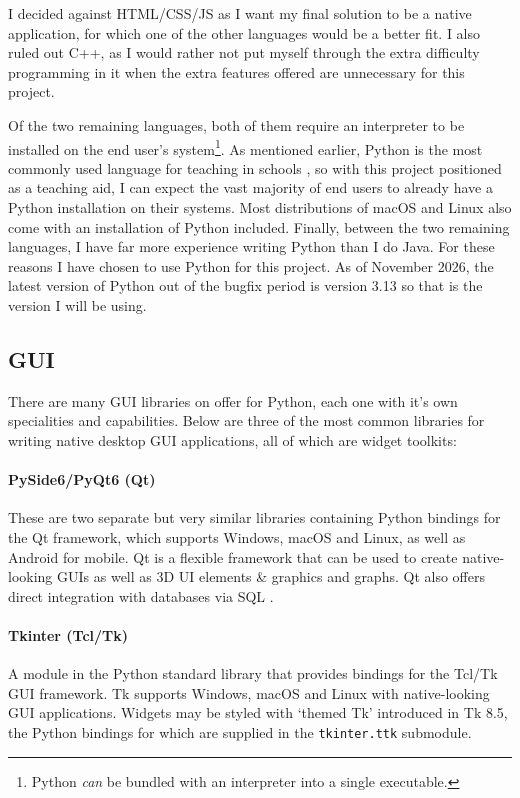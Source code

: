 \documentclass{report}
\begin{document}
I decided against HTML/CSS/JS as I want my final solution to be a native
application, for which one of the other languages would be a better fit. I
also ruled out C++, as I would rather not put myself through the extra
difficulty programming in it when the extra features offered are
unnecessary for this project.

Of the two remaining languages, both of them require an interpreter to be
installed on the end user's system\footnote{\label{foot:pyinstaller}Python
\textit{can} be bundled with an interpreter into a single executable.}.
As mentioned earlier, Python is the most commonly used language for teaching in
schools \cite{hadwenbennett2024programming}, so with this project positioned as
a teaching aid, I can expect the vast majority of end users to already have a
Python installation on their systems. Most distributions of macOS and Linux
also come with an installation of Python included. Finally, between the two
remaining languages, I have far more experience writing Python than I do Java.
For these reasons I have chosen to use Python for this project. As of November
2026, the latest version of Python out of the bugfix period is version 3.13 so
that is the version I will be using.

\subsection{GUI}
There are many GUI libraries on offer for Python, each one with it's own
specialities and capabilities. Below are three of the most common libraries
for writing native desktop GUI applications, all of which are widget toolkits:

\paragraph{PySide6/PyQt6 (Qt)}
These are two separate but very similar libraries containing Python bindings
for the Qt framework, which supports Windows, macOS and Linux, as well as
Android for mobile. Qt is a flexible framework that can be used to create
native-looking GUIs as well as 3D UI elements \& graphics and graphs. Qt also
offers direct integration with databases via SQL \cite{qtfeatures}.

\paragraph{Tkinter (Tcl/Tk)}
A module in the Python standard library that provides bindings for the Tcl/Tk
GUI framework. Tk supports Windows, macOS and Linux with native-looking GUI
applications. Widgets may be styled with `themed Tk' introduced in Tk 8.5, the
Python bindings for which are supplied in the \texttt{tkinter.ttk}
submodule.
\end{document}
